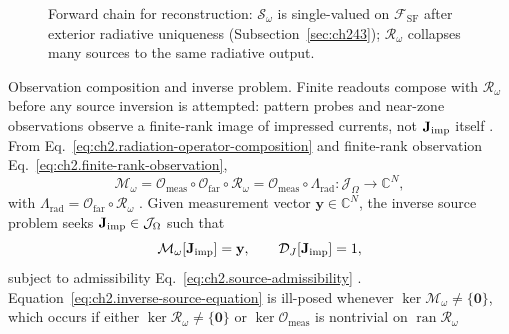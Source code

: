 \begin{figure}[t]
\centering
{}
\caption{Forward chain for reconstruction: \(\mathcal{S}_\omega\) is single-valued on
\(\mathcal{F}_{\mathrm{SF}}\) after exterior radiative uniqueness (Subsection~\ref{sec:ch243});
\(\mathcal{R}_\omega\) collapses many sources to the same radiative output.}
\label{fig:ch2.reconstruction-forward-chain}
\end{figure}
Observation composition and inverse problem. Finite readouts compose with $\mathcal{R}_\omega$ before any source inversion
is attempted: pattern probes and near-zone observations observe a finite-rank image of impressed
currents, not $\mathbf{J}_{\mathrm{imp}}$ itself \cite{hansen1988}. From
Eq.~\eqref{eq:ch2.radiation-operator-composition} and finite-rank observation
Eq.~\eqref{eq:ch2.finite-rank-observation},
\begin{equation}
\label{eq:ch2.reconstruction-observation-map}
\mathcal{M}_\omega
=
\mathcal{O}_{\mathrm{meas}}\circ\mathcal{O}_{\mathrm{far}}\circ\mathcal{R}_\omega
=
\mathcal{O}_{\mathrm{meas}}\circ\Lambda_{\mathrm{rad}}:
\mathcal{J}_\Omega\longrightarrow\mathbb{C}^{N},
\end{equation}
with \(\Lambda_{\mathrm{rad}}=\mathcal{O}_{\mathrm{far}}\circ\mathcal{R}_\omega\)
\cite{stratton1941}. Given measurement vector
\(\mathbf{y}\in\mathbb{C}^{N}\), the inverse source problem seeks
\(\mathbf{J}_{\mathrm{imp}}\in\mathcal{J}_\Omega\) such that
\begin{equation}
\label{eq:ch2.inverse-source-equation}
\mathcal{M}_\omega[\mathbf{J}_{\mathrm{imp}}]=\mathbf{y},
\qquad
\mathcal{D}_{J}[\mathbf{J}_{\mathrm{imp}}]=1,
\end{equation}
subject to admissibility Eq.~\eqref{eq:ch2.source-admissibility}
\cite{harrington2001}. Equation~\eqref{eq:ch2.inverse-source-equation} is ill-posed
whenever \(\ker\mathcal{M}_\omega\neq\{\mathbf{0}\}\), which occurs if either
\(\ker\mathcal{R}_\omega\neq\{\mathbf{0}\}\) or \(\ker\mathcal{O}_{\mathrm{meas}}\)
is nontrivial on \(\operatorname{ran}\mathcal{R}_\omega\)
